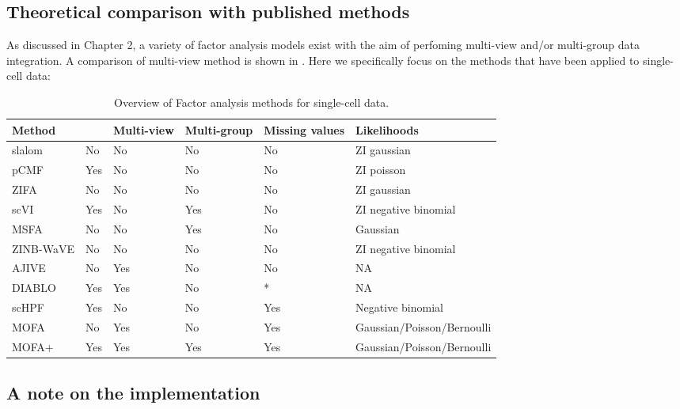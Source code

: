 \subsection{Theoretical comparison with published methods}

As discussed in Chapter 2, a variety of factor analysis models exist with the aim of perfoming multi-view and/or multi-group data integration. A comparison of multi-view method is shown in . Here we specifically focus on the methods that have been applied to single-cell data:

\begin{table}[h]
	\begin{tabular}{@{}llllll} 
		\toprule

		{\textbf{Method}} & {\textbf{\parbox{2.0cm}{Scales to\\$>1e5$ cells?}}} & {\textbf{\parbox{2.0cm}{Multi-view}}} & {\textbf{\parbox{2.0cm}{Multi-group}}} & {\textbf{\parbox{2.0cm}{Missing values}}} & {\textbf{\parbox{2.0cm}{Likelihoods}}} \\ \toprule
		slalom \cite{Buettner2017} & No & No & No & No & ZI gaussian \\\midrule
		pCMF \cite{Durif2019} & Yes & No & No & No & ZI poisson \\\midrule
		ZIFA \cite{Pierson2015} & No & No & No & No & ZI gaussian \\\midrule
		scVI \cite{Lopez2018} & Yes & No & Yes & No & ZI negative binomial \\\midrule
		MSFA \cite{DeVito2019} & No & No & Yes & No & Gaussian \\\midrule
		ZINB-WaVE \cite{Risso2018} & No & No & No & No & ZI negative binomial \\\midrule
		AJIVE \cite{Feng2018} & No & Yes & No & No & NA \\\midrule
		DIABLO \cite{Singh2018} & Yes & Yes & No & * & NA \\\midrule
		scHPF \cite{Levitin2019} & Yes & No & No & Yes & Negative binomial \\\midrule
		MOFA \cite{Argelaguet2018} & No & Yes & No & Yes & Gaussian/Poisson/Bernoulli \\\midrule
		MOFA+ & Yes & Yes & Yes & Yes & Gaussian/Poisson/Bernoulli \\\midrule
	\end{tabular}
	\caption{Overview of Factor analysis methods for single-cell data.}
\end{table}


\subsection{A note on the implementation}

